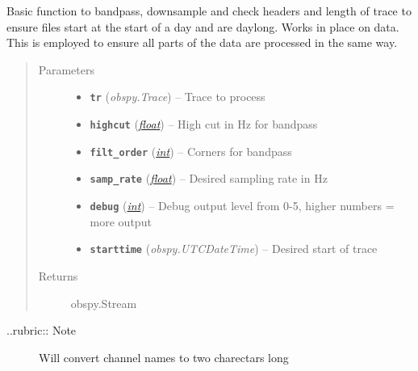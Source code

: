 \documentclass[a4paper,10pt,english]{sphinxmanual}
\begin{document}
\begin{fulllineitems}
\label{submodules/utils.pre_processing:pre_processing.dayproc}
Basic function to bandpass, downsample and check headers and length of trace
to ensure files start at the start of a day and are daylong.  Works in place
on data.  This is employed to ensure all parts of the data are processed
in the same way.
\begin{quote}\begin{description}
\item[{Parameters}] \leavevmode\begin{itemize}
\item {} 
\textbf{\texttt{tr}} (\emph{obspy.Trace}) -- Trace to process

\item {} 
\textbf{\texttt{highcut}} (\href{https://docs.python.org/library/functions.html\#float}{\emph{float}}) -- High cut in Hz for bandpass

\item {} 
\textbf{\texttt{filt\_order}} (\href{https://docs.python.org/library/functions.html\#int}{\emph{int}}) -- Corners for bandpass

\item {} 
\textbf{\texttt{samp\_rate}} (\href{https://docs.python.org/library/functions.html\#float}{\emph{float}}) -- Desired sampling rate in Hz

\item {} 
\textbf{\texttt{debug}} (\href{https://docs.python.org/library/functions.html\#int}{\emph{int}}) -- Debug output level from 0-5, higher numbers = more output

\item {} 
\textbf{\texttt{starttime}} (\emph{obspy.UTCDateTime}) -- Desired start of trace

\end{itemize}

\item[{Returns}] \leavevmode
obspy.Stream

\end{description}\end{quote}
\begin{description}
\item[{..rubric:: Note}] \leavevmode
Will convert channel names to two charectars long

\end{description}

\end{fulllineitems}
\end{document}

